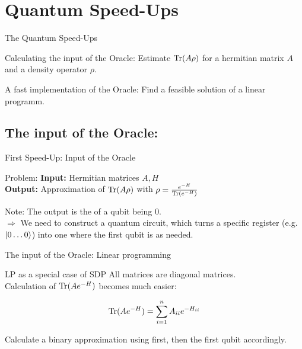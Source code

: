 \section{Quantum Speed-Ups}


\begin{frame}{The Quantum Speed-Ups}
 \begin{block}{Calculating the input of the Oracle:}
  Estimate $\operatorname{Tr}(A\rho)$ for a hermitian matrix $A$ and a density operator $\rho$.
 \end{block}
 
 \begin{block}{A fast implementation of the Oracle:}
  Find a feasible solution of a linear programm.
 \end{block}
\end{frame}

\subsection{The input of the Oracle:}

\begin{frame}{First Speed-Up: Input of the Oracle}
 \begin{block}{Problem:}
  \textbf{Input:} Hermitian matrices $A,H$ \\
  \textbf{Output:} Approximation of $\operatorname{Tr}(A\rho)$ with $\rho=\frac{e^{-H}}{\operatorname{Tr}(e^{-H})}$
 \end{block}
 
 \begin{block}{Note:}
  The output is the  of a qubit being $0$.\\
  \alert{$\Rightarrow$ We need to construct a quantum circuit, which turns a specific register (e.g. $\ket{0\ldots 0}$) into one where the first qubit is as needed.}
 \end{block} 
\end{frame}

\begin{frame}{The input of the Oracle: Linear programming}
\begin{block}{LP as a special case of SDP}
All matrices are diagonal matrices.\\
\alert{Calculation of $\operatorname{Tr}(Ae^{-H})$ becomes much easier:}

\begin{equation*}
\operatorname{Tr}(Ae^{-H})=\sum_{i=1}^n A_{ii}e^{-H_{ii}}
\end{equation*}

\end{block}

\vspace{1cm}

 Calculate a binary approximation using  first, then  the first qubit accordingly.

\end{frame}

